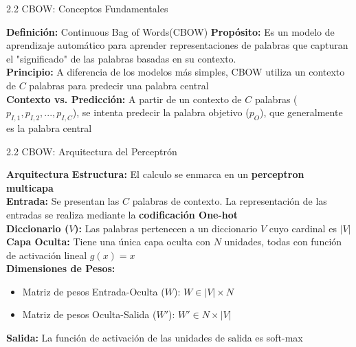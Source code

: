 \documentclass{beamer}
\begin{document}
	
\begin{frame}[fragile]{2.2 CBOW: Conceptos Fundamentales}
	\begin{block}{\textbf{Definición:} Continuous Bag of Words(CBOW)}
		\justifying
		\vspace{0.1cm}
		\textbf{Propósito:} Es un modelo de aprendizaje automático para aprender representaciones de palabras que capturan el "significado" de las palabras basadas en su contexto.\\
		\vspace{0.1cm}
		\textbf{Principio:} A diferencia de los modelos más simples, CBOW utiliza un contexto de $C$ palabras para predecir una palabra central\\
		\vspace{0.1cm}
		\textbf{Contexto vs. Predicción:}  A partir de un contexto de $C$ palabras ($p_{I,1}, p_{I,2}, ..., p_{I,C}$), se intenta predecir la palabra objetivo ($p_O$), que generalmente es la palabra central
	\end{block}
	
\end{frame}

\begin{frame}[fragile]{2.2 CBOW: Arquitectura del Perceptrón}
	\begin{block}{\textbf{Arquitectura}}
		\justifying
		\vspace{0.1cm}
		\textbf{Estructura:} El calculo se enmarca en un \textbf{perceptron multicapa}\\
		\vspace{0.1cm}
		\textbf{Entrada:} Se presentan las $C$ palabras de contexto. La representación de las entradas se realiza mediante la \textbf{codificación One-hot}\\
		\vspace{0.1cm}
		\textbf{Diccionario ($V$):} Las palabras pertenecen a un diccionario $V$ cuyo cardinal es $|V|$ \\
		\vspace{0.1cm}
		\textbf{Capa Oculta:} Tiene una única capa oculta con $N$ unidades, todas con función de activación lineal $g(x) = x$ \\
		\vspace{0.1cm}
		\textbf{Dimensiones de Pesos:} 						\\
		\begin{itemize}
			\item Matriz de pesos Entrada-Oculta ($W$): $W \in |V| \times N$\\
			\item Matriz de pesos Oculta-Salida ($W'$): $W' \in N \times |V|$
		\end{itemize}
		\vspace{0.1cm}
		\textbf{Salida:} La función de activación de las unidades de salida es soft-max 
	\end{block}
	
\end{frame}
	
\end{document}
